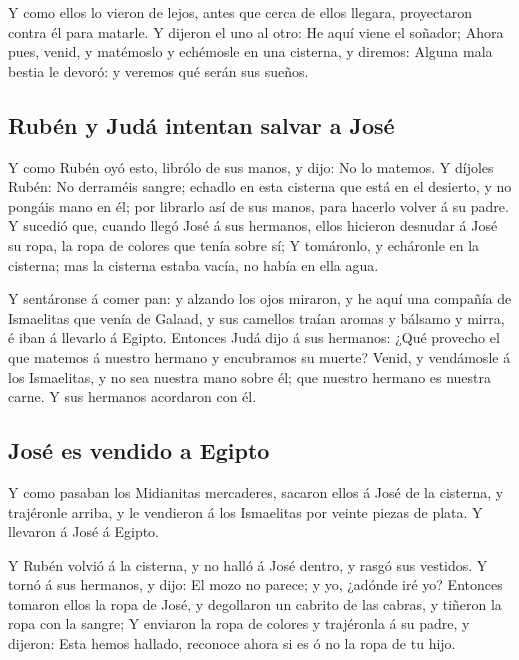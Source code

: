  Y como ellos lo vieron de lejos, antes que cerca de ellos
llegara, proyectaron contra él para matarle.  Y dijeron el
uno al otro: He aquí viene el soñador;  Ahora pues, venid,
y matémoslo y echémosle en una cisterna, y diremos: Alguna mala bestia
le devoró: y veremos qué serán sus sueños.

\hypertarget{rubuxe9n-y-juduxe1-intentan-salvar-a-josuxe9}{%
\subsection{Rubén y Judá intentan salvar a
José}\label{rubuxe9n-y-juduxe1-intentan-salvar-a-josuxe9}}

 Y como Rubén oyó esto, librólo de sus manos, y dijo: No lo
matemos.  Y díjoles Rubén: No derraméis sangre; echadlo en
esta cisterna que está en el desierto, y no pongáis mano en él; por
librarlo así de sus manos, para hacerlo volver á su padre. 
Y sucedió que, cuando llegó José á sus hermanos, ellos hicieron desnudar
á José su ropa, la ropa de colores que tenía sobre sí;  Y
tomáronlo, y echáronle en la cisterna; mas la cisterna estaba vacía, no
había en ella agua.

 Y sentáronse á comer pan: y alzando los ojos miraron, y he
aquí una compañía de Ismaelitas que venía de Galaad, y sus camellos
traían aromas y bálsamo y mirra, é iban á llevarlo á Egipto.
 Entonces Judá dijo á sus hermanos: ¿Qué provecho el que
matemos á nuestro hermano y encubramos su muerte?  Venid, y
vendámosle á los Ismaelitas, y no sea nuestra mano sobre él; que nuestro
hermano es nuestra carne. Y sus hermanos acordaron con él.

\hypertarget{josuxe9-es-vendido-a-egipto}{%
\subsection{José es vendido a
Egipto}\label{josuxe9-es-vendido-a-egipto}}

 Y como pasaban los Midianitas mercaderes, sacaron ellos á
José de la cisterna, y trajéronle arriba, y le vendieron á los
Ismaelitas por veinte piezas de plata. Y llevaron á José á Egipto.

 Y Rubén volvió á la cisterna, y no halló á José dentro, y
rasgó sus vestidos.  Y tornó á sus hermanos, y dijo: El
mozo no parece; y yo, ¿adónde iré yo?  Entonces tomaron
ellos la ropa de José, y degollaron un cabrito de las cabras, y tiñeron
la ropa con la sangre;  Y enviaron la ropa de colores y
trajéronla á su padre, y dijeron: Esta hemos hallado, reconoce ahora si
es ó no la ropa de tu hijo.


